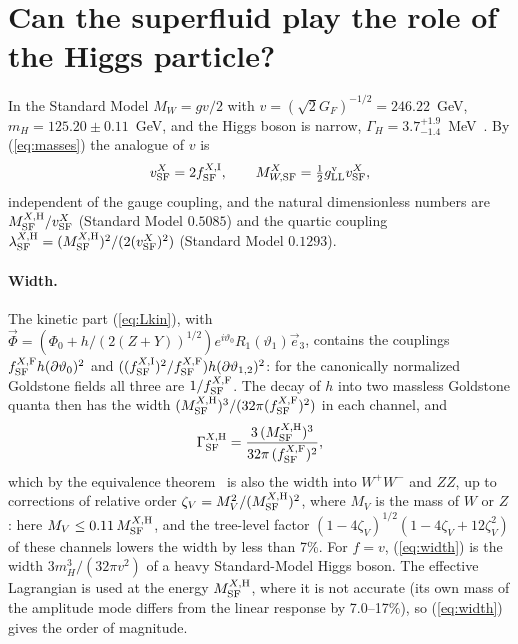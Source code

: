\documentclass[aps,prd,twocolumn,superscriptaddress,nofootinbib,floatfix,longbibliography]{revtex4-2}
\newcommand{\LL}{{\rm LL}}
\newcommand{\SF}{{\rm SF}}
\begin{document}
\section{Can the superfluid play the role of the Higgs particle?}
\label{sec:higgs}

In the Standard Model $M_W=gv/2$ with $v=(\sqrt2G_F)^{-1/2}=246.22$~GeV, $m_H=125.20\pm0.11$~GeV, and the Higgs boson is
narrow, $\Gamma_H=3.7^{+1.9}_{-1.4}$~MeV~\cite{PDG2024,CMSwidth2022}. By (\ref{eq:masses}) the analogue of $v$ is
\begin{equation}
v^X_\SF=2f^{X,{\rm I}}_\SF ,\qquad M^X_{W,\SF}=\tfrac12g^{\rm v}_\LL v^X_\SF ,
\label{eq:vSF}
\end{equation}
independent of the gauge coupling, and the natural dimensionless numbers are $M^{X,{\rm H}}_\SF/v^X_\SF$ (Standard Model
$0.5085$) and the quartic coupling $\lambda^{X,{\rm H}}_\SF=(M^{X,{\rm H}}_\SF)^2/(2(v^X_\SF)^2)$ (Standard Model $0.1293$).

\paragraph*{Width.}
The kinetic part (\ref{eq:Lkin}), with $\vec\Phi=(\Phi_0+h/(2(Z+Y))^{1/2})e^{i\vartheta_0}R_1(\vartheta_1)\vec e_3$, contains the
couplings $f^{X,{\rm F}}_\SF h(\partial\vartheta_0)^2$ and $((f^{X,{\rm I}}_\SF)^2/f^{X,{\rm F}}_\SF)h(\partial\vartheta_{1,2})^2$: for the
canonically normalized Goldstone fields all three are $1/f^{X,{\rm F}}_\SF$. The decay of $h$ into two massless Goldstone
quanta then has the width $(M^{X,{\rm H}}_\SF)^3/(32\pi(f^{X,{\rm F}}_\SF)^2)$ in each channel, and
\begin{equation}
\Gamma^{X,{\rm H}}_\SF=\frac{3\,(M^{X,{\rm H}}_\SF)^3}{32\pi\,(f^{X,{\rm F}}_\SF)^2},
\label{eq:width}
\end{equation}
which by the equivalence theorem~\cite{CLT1974,ChanowitzGaillard1985} is also the width into $W^+W^-$ and $ZZ$, up to corrections
of relative order $\zeta_V=M_V^2/(M^{X,{\rm H}}_\SF)^2$, where $M_V$ is the mass of $W$ or $Z$: here $M_V\le0.11\,M^{X,{\rm H}}_\SF$,
and the tree-level factor $(1-4\zeta_V)^{1/2}(1-4\zeta_V+12\zeta_V^2)$ of these channels lowers the width by less than
7\%. For $f=v$,
(\ref{eq:width}) is the width $3m_H^3/(32\pi v^2)$ of a heavy Standard-Model Higgs boson. The effective Lagrangian is used at the energy $M^{X,{\rm H}}_\SF$, where it is not accurate (its own mass of the
amplitude mode differs from the linear response by 7.0\mbox{--}17\%), so (\ref{eq:width}) gives the order of magnitude.
\end{document}
